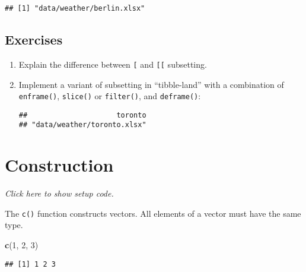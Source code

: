 \documentclass[]{book}
\newenvironment{Shaded}{\begin{snugshade}}{\end{snugshade}}
\newcommand{\DecValTok}[1]{\textcolor[rgb]{0.00,0.00,0.81}{#1}}
\newcommand{\KeywordTok}[1]{\textcolor[rgb]{0.13,0.29,0.53}{\textbf{#1}}}
\newcommand{\NormalTok}[1]{#1}
\newcommand{\OperatorTok}[1]{\textcolor[rgb]{0.81,0.36,0.00}{\textbf{#1}}}
\newcommand{\StringTok}[1]{\textcolor[rgb]{0.31,0.60,0.02}{#1}}
\begin{document}
\begin{verbatim}
## [1] "data/weather/berlin.xlsx"
\end{verbatim}

\hypertarget{exercises-8}{%
\subsection{Exercises}\label{exercises-8}}

\begin{enumerate}
\def\labelenumi{\arabic{enumi}.}
\item
  Explain the difference between \texttt{{[}} and \texttt{{[}{[}} subsetting.
\item
  Implement a variant of subsetting in ``tibble-land'' with a combination of \texttt{enframe()}, \texttt{slice()} or \texttt{filter()}, and \texttt{deframe()}:

\begin{Shaded}
\end{Shaded}

\begin{verbatim}
##                     toronto 
## "data/weather/toronto.xlsx"
\end{verbatim}
\end{enumerate}

\hypertarget{construction}{%
\section{Construction}\label{construction}}

\emph{Click here to show setup code.}

The \texttt{c()} function constructs vectors.
All elements of a vector must have the same type.

\begin{Shaded}
\begin{Highlighting}[]
\KeywordTok{c}\NormalTok{(}\DecValTok{1}\NormalTok{, }\DecValTok{2}\NormalTok{, }\DecValTok{3}\NormalTok{)}
\end{Highlighting}
\end{Shaded}

\begin{verbatim}
## [1] 1 2 3
\end{verbatim}
\end{document}
